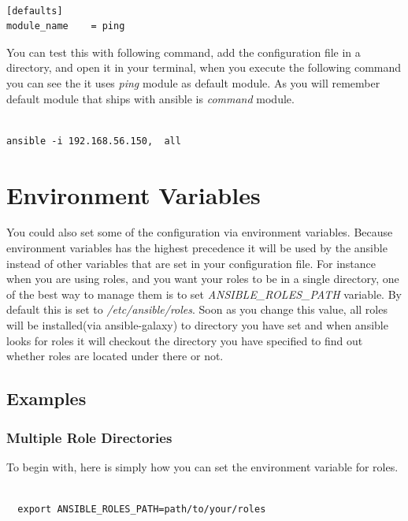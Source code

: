 \documentclass[10pt]{book}
\begin{document}
\begin{verbatim}

[defaults]
module_name    = ping

\end{verbatim}

You can test this with following command, add the configuration file in a 
directory, and open it in your terminal, when you execute the following command 
you can see the it uses \emph{ping} module as default module. As you will 
remember default module that ships with ansible is \emph{command} module.

\begin{verbatim}

ansible -i 192.168.56.150,  all

\end{verbatim}



\section{Environment Variables}
You could also set some of the configuration via environment variables. Because 
environment variables has the highest precedence it will be used by the ansible 
instead of other variables that are set in your configuration file. For instance 
when you are using roles, and you want your roles to be in a single directory, 
one of the best way to manage them is to set \emph{ANSIBLE\_ROLES\_PATH} variable. 
By default this is set to \emph{/etc/ansible/roles}. Soon as you change this 
value, all roles will be installed(via ansible-galaxy) to directory you have set 
and when ansible looks for roles it will checkout the directory you have 
specified to find out whether roles are located under there or not. 

\subsection{Examples}
\subsubsection{Multiple Role Directories}
To begin with, here is simply how you can set the environment variable for 
roles.

\begin{verbatim}
  
  export ANSIBLE_ROLES_PATH=path/to/your/roles
  
\end{verbatim}
\end{document}
